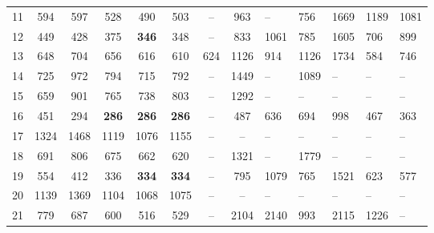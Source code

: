 \begin{table}[ht]
{\begin{tabular}{c|ccccccc}
            11 & 594            & 597           & 528           & 490           & 503           & --            & 963           & --            & 756           & 1669          & 1189          & 1081          \\ 
            12 & 449            & 428           & 375           & \textbf{346}  & 348           & --            & 833           & 1061          & 785           & 1605          & 706           & 899           \\ 
            13 & 648            & 704           & 656           & 616           & 610           & 624           & 1126          & 914           & 1126          & 1734          & 584           & 746           \\ 
            14 & 725            & 972           & 794           & 715           & 792           & --            & 1449          & --            & 1089          & --            & --            & --            \\ 
            15 & 659            & 901           & 765           & 738           & 803           & --            & 1292          & --            & --            & --            & --            & --            \\ 
            16 & 451            & 294           & \textbf{286}  & \textbf{286}  & \textbf{286}  & --            & 487           & 636           & 694           & 998           & 467           & 363           \\ 
            17 & 1324           & 1468          & 1119          & 1076          & 1155          & --            & --            & --            & --            & --            & --            & --            \\ 
            18 & 691            & 806           & 675           & 662           & 620           & --            & 1321          & --            & 1779          & --            & --            & --            \\ 
            19 & 554            & 412           & 336           & \textbf{334}  & \textbf{334}  & --            & 795           & 1079          & 765           & 1521          & 623           & 577           \\ 
            20 & 1139           & 1369          & 1104          & 1068          & 1075          & --            & --            & --            & --            & --            & --            & --            \\ 
            21 & 779            & 687           & 600           & 516           & 529           & --            & 2104          & 2140          & 993           & 2115          & 1226          & --            \\ 
            \bottomrule
        \end{tabular}
    }
\end{table}

